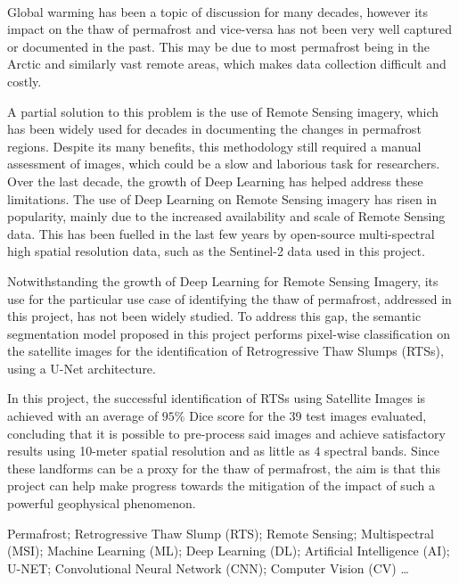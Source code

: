 \paragraph{}
Global warming has been a topic of discussion for many decades, however its impact on the thaw of permafrost and vice-versa has not been very well captured or documented in the past. This may be due to most permafrost being in the Arctic and similarly vast remote areas, which makes data collection difficult and costly.

A partial solution to this problem is the use of Remote Sensing imagery, which has been widely used for decades in documenting the changes in permafrost regions. Despite its many benefits, this methodology still required a manual assessment of images, which could be a slow and laborious task for researchers.
Over the last decade, the growth of Deep Learning has helped address these limitations. The use of Deep Learning on Remote Sensing imagery has risen in popularity, mainly due to the increased availability and scale of Remote Sensing data. This has been fuelled in the last few years by open-source multi-spectral high spatial resolution data, such as the Sentinel-2 data used in this project.

Notwithstanding the growth of Deep Learning for Remote Sensing Imagery, its use for the particular use case of identifying the thaw of permafrost, addressed in this project, has not been widely studied. To address this gap, the semantic segmentation model proposed in this project performs pixel-wise classification on the satellite images for the identification of Retrogressive Thaw Slumps (RTSs), using a U-Net architecture.

In this project, the successful identification of RTSs using Satellite Images is achieved with an average of $95\%$ Dice score for the 39 test images evaluated, concluding that it is possible to pre-process said images and achieve satisfactory results using 10-meter spatial resolution and as little as $4$ spectral bands. Since these landforms can be a proxy for the thaw of permafrost, the aim is that this project can help make progress towards the mitigation of the impact of such a powerful geophysical phenomenon.


\begin{keywords}
Permafrost; Retrogressive Thaw Slump (RTS); Remote Sensing;  Multispectral (MSI); Machine Learning (ML); Deep Learning (DL); Artificial Intelligence (AI); U-NET; Convolutional Neural Network (CNN); Computer Vision (CV) \ldots
\end{keywords} 
